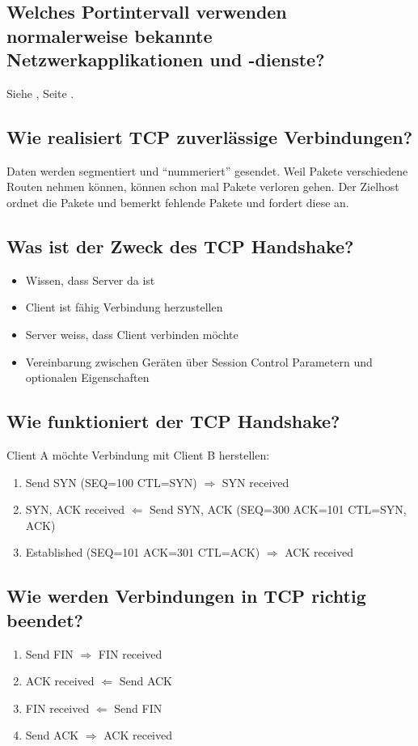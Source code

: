 \subsection*{Welches Portintervall verwenden normalerweise bekannte Netzwerkapplikationen und -dienste?}
Siehe \underline{}, Seite \pageref{sub:Ports}.

\subsection*{Wie realisiert TCP zuverlässige Verbindungen?}
Daten werden segmentiert und "`nummeriert"' gesendet. Weil Pakete verschiedene Routen nehmen können, können schon mal Pakete verloren gehen. Der Zielhost ordnet die Pakete und bemerkt fehlende Pakete und fordert diese an.

\subsection*{Was ist der Zweck des TCP Handshake?}
\begin{itemize}
    \item Wissen, dass Server da ist
    \item Client ist fähig Verbindung herzustellen
    \item Server weiss, dass Client verbinden möchte
    \item Vereinbarung zwischen Geräten über Session Control Parametern und optionalen Eigenschaften
\end{itemize}

\subsection*{Wie funktioniert der TCP Handshake?}
Client A möchte Verbindung mit Client B herstellen:\\
\begin{enumerate}
    \item Send SYN (SEQ=100 CTL=SYN) $\Rightarrow$ SYN received
    \item SYN, ACK received $\Leftarrow$ Send SYN, ACK (SEQ=300 ACK=101 CTL=SYN, ACK)
    \item Established (SEQ=101 ACK=301 CTL=ACK) $\Rightarrow$ ACK received
\end{enumerate}

\subsection*{Wie werden Verbindungen in TCP richtig beendet?}
\begin{enumerate}
    \item Send FIN $\Rightarrow$ FIN received
    \item ACK received $\Leftarrow$ Send ACK
    \item FIN received $\Leftarrow$ Send FIN
    \item Send ACK $\Rightarrow$ ACK received
\end{enumerate}

